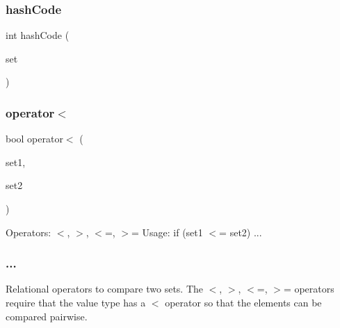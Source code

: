 \subsubsection{\texorpdfstring{hash\+Code}{hashCode}}
{\footnotesize\ttfamily int hash\+Code (\begin{DoxyParamCaption}\item[{const \mbox{\hyperlink{classstanfordcpplib_1_1collections_1_1GenericSet}{Generic\+Set}}$<$ \mbox{\hyperlink{structstanfordcpplib_1_1collections_1_1SetTraits}{Set\+Traits}} $>$ \&}]{set }\end{DoxyParamCaption})\hspace{0.3cm}{\ttfamily [friend]}}

\mbox{\label{classstanfordcpplib_1_1collections_1_1GenericSet_ab2c038f3c2f75cc78c062f0b3b16a411}} 
\subsubsection{\texorpdfstring{operator$<$}{operator<}}
{\footnotesize\ttfamily bool operator$<$ (\begin{DoxyParamCaption}\item[{const \mbox{\hyperlink{classstanfordcpplib_1_1collections_1_1GenericSet}{Generic\+Set}}$<$ Traits $>$ \&}]{set1,  }\item[{const \mbox{\hyperlink{classstanfordcpplib_1_1collections_1_1GenericSet}{Generic\+Set}}$<$ Traits $>$ \&}]{set2 }\end{DoxyParamCaption})\hspace{0.3cm}{\ttfamily [friend]}}



Operators\+: $<$, $>$, $<$=, $>$= Usage\+: if (set1 $<$= set2) ... 

\subsubsection*{... }

Relational operators to compare two sets. The $<$, $>$, $<$=, $>$= operators require that the value type has a $<$ operator so that the elements can be compared pairwise.

